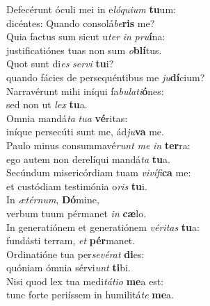 \evenverse Defecérunt óculi mei in e\textit{ló}\textit{qui}\textit{um} \textbf{tu}um:~\*\\
\evenverse dicéntes: Quando consolá\textit{be}\textbf{ris} me?\\
\oddverse Quia factus sum sicut u\textit{ter} \textit{in} \textit{pru}\textbf{í}na:~\*\\
\oddverse justificatiónes tuas non sum \textit{o}\textbf{blí}tus.\\
\evenverse Quot sunt di\textit{es} \textit{ser}\textit{vi} \textbf{tu}i?~\*\\
\evenverse quando fácies de persequéntibus me \textit{ju}\textbf{dí}cium?\\
\oddverse Narravérunt mihi iníqui fa\textit{bu}\textit{la}\textit{ti}\textbf{ó}nes:~\*\\
\oddverse sed non ut \textit{lex} \textbf{tu}a.\\
\evenverse Omnia mandá\textit{ta} \textit{tu}\textit{a} \textbf{vé}ritas:~\*\\
\evenverse iníque persecúti sunt me, ád\textit{ju}\textbf{va} me.\\
\oddverse Paulo minus consummavé\textit{runt} \textit{me} \textit{in} \textbf{ter}ra:~\*\\
\oddverse ego autem non derelíqui mandá\textit{ta} \textbf{tu}a.\\
\evenverse Secúndum misericórdiam tuam \textit{vi}\textit{ví}\textit{fi}\textbf{ca} me:~\*\\
\evenverse et custódiam testimónia o\textit{ris} \textbf{tu}i.\\
\oddverse In \textit{æ}\textit{tér}\textit{num}, \textbf{Dó}mine,~\*\\
\oddverse verbum tuum pérmanet \textit{in} \textbf{cæ}lo.\\
\evenverse In generatiónem et generatiónem \textit{vé}\textit{ri}\textit{tas} \textbf{tu}a:~\*\\
\evenverse fundásti terram, \textit{et} \textbf{pér}manet.\\
\oddverse Ordinatióne tua per\textit{se}\textit{vé}\textit{rat} \textbf{di}es:~\*\\
\oddverse quóniam ómnia sérvi\textit{unt} \textbf{ti}bi.\\
\evenverse Nisi quod lex tua medi\textit{tá}\textit{ti}\textit{o} \textbf{me}a est:~\*\\
\evenverse tunc forte periíssem in humilitá\textit{te} \textbf{me}a.\\
